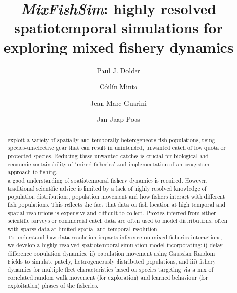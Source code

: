 \documentclass[review]{elsarticle}
\begin{document}
\begin{frontmatter}
\title{\emph{MixFishSim}: highly resolved spatiotemporal simulations for
	exploring mixed fishery dynamics}

\author[1,2]{Paul J. Dolder}

\author[1]{Cóilín Minto}
\author[3]{Jean-Marc Guarini}
\author[4]{Jan Jaap Poos}

\address[1]{Galway-Mayo Institute of Technology (GMIT), Dublin Road, Galway,
	Ireland} 
\address[2]{Centre for Environment, Fisheries and Aquaculture Science (Cefas),
	Pakefield Road, Lowestoft, UK}
\address[3]{, 4 Place Jussieu,
	75005 Paris, France}
\address[4]{Wageningen Marine Research, Haringkade 1 1976 CP IJmuiden,
	Netherlands}

\begin{abstract}

 exploit a variety 
of spatially and temporally heterogeneous fish populations, using
species-unselective gear that can result in unintended, unwanted catch of low
quota or protected species. Reducing these unwanted catches is crucial for
biological and economic sustainability of `mixed fisheries' and implementation
of an ecosystem approach to fishing. \\

 a good understanding of
spatiotemporal fishery dynamics is required. However, traditional scientific
advice is limited by a lack of highly resolved knowledge of population
distributions, population movement and how fishers interact with different fish
populations. This reflects the fact that data on fish location at high temporal
and spatial resolutions is expensive and difficult to collect. Proxies inferred
from either scientific surveys or commercial catch data are often used to model
distributions, often with sparse data at limited spatial and temporal
resolution. \\ 

To understand how data resolution impacts inference on mixed fisheries
interactions, we develop a highly resolved spatiotemporal simulation model
incorporating: i) delay-difference population dynamics, ii) population movement
using Gaussian Random Fields to simulate patchy, heterogeneously distributed
populations, and iii) fishery dynamics for multiple fleet characteristics based
on species targeting via a mix of correlated random walk movement (for
exploration) and learned behaviour (for exploitation) phases of the fisheries.
\\ 


\end{abstract}
\end{frontmatter}
\end{document}
